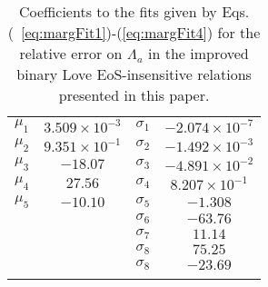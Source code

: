 \documentclass[prd,twocolumn,nofootinbib,superscriptaddress,amsmath,amssymb]{revtex4-1}
\begin{document}
\begin{table}
\centering
\caption{
Coefficients to the fits given by Eqs.(~\ref{eq:margFit1})-(\ref{eq:margFit4}) for the relative error on $\Lambda_a$ in the improved binary Love EoS-insensitive relations presented in this paper.
}\label{tab:marginalized}
\addtolength{\tabcolsep}{1pt} 
\begin{tabular}{ c | c || c | c}
\hline 
\noalign{\smallskip}
$\mu_1$ & $3.509 \times 10^{-3}$ & $\sigma_1$ & $-2.074 \times 10^{-7}$\\
$\mu_2$ & $9.351 \times 10^{-1}$ & $\sigma_2$ & $-1.492 \times 10^{-3}$\\
$\mu_3$ & $-18.07$ & $\sigma_3$ & $-4.891 \times 10^{-2}$\\
$\mu_4$ & $27.56$ & $\sigma_4$ & $8.207 \times 10^{-1}$\\
$\mu_5$ & $-10.10$ & $\sigma_5$ & $-1.308$\\
 &  & $\sigma_6$ & $-63.76$\\
 &  & $\sigma_7$ & $11.14$\\
 &  & $\sigma_8$ & $75.25$\\
 &  & $\sigma_8$ & $-23.69$\\
 \noalign{\smallskip}
 \hline
\end{tabular}
\addtolength{\tabcolsep}{-1pt}
\end{table}
\end{document}
